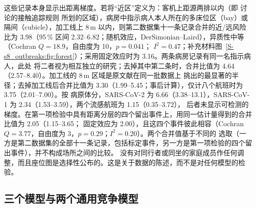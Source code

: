 这些记录本身显示出距离梯度。若将“近区”定义为：客机上距源两排以内（即 \citet{hertzberg2016risk} 讨论的接触追踪规则
所划的区域），病房中指示病人本人所在的多床位区（bay）或隔间（cubicle），加工线上 8\,m 以内，则第二数据集十一条记录合并的近/远风险比为
3.98（95\,\% 区间 2.32--6.82；随机效应，DerSimonian--Laird），异质性中等（Cochran $Q=18.9$，自由度为 10，$p=0.041$；
$I^2=0.47$；补充材料图~\ref{S-s8_outbreaks:fig:forest}）；采用固定效应时为 3.16。两条病房记录有同一名指示病人，此处
将二者视为相互独立的研究；去掉其中第二条时，合并比值为 4.64（2.57--8.40）。加工线的 8\,m 区域是原文献在同一批数据上
挑出的最显著的半径；去掉加工线后合并比值为 3.30（1.99--5.45；事后计算），仅计八个航班时为 3.75（2.01--7.00）。按
病原体分，SARS-CoV-2 为 6.66（3.38--13.1），SARS-CoV-1 为 2.34（1.53--3.59），两个流感航班为 1.15（0.35--3.72），
后者未显示可检测的梯度。在第一项检验中具有距离分层的四个留出事件上，用同一估计量得到的合并比值为 2.05（1.15--3.65；
固定效应为 2.00），且这四个事件彼此相容（Cochran $Q=3.77$，自由度为 3，$p=0.29$；$I^2=0.20$）。两个合并值基于不同的
选取（一方是第二数据集的全部十一条记录，包括标定事件，另一方是第一项检验的四个留出事件），并不构成场所之间的比较。
没有对同行者或同坐的家庭成员作任何调整，而且座位图是选择性公布的。这是关于数据的陈述，而不是对任何模型的检验。

\subsection{三个模型与两个通用竞争模型}\label{s8_outbreaks:sec:models}


